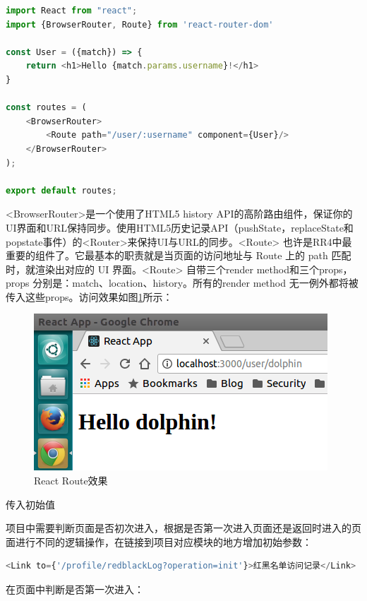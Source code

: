 \documentclass[12pt]{book}
\makeatletter
\numberwithin{dummy}{section}
\theoremstyle{ocrenumbox}
\theoremstyle{blacknumex}
\theoremstyle{blacknumbox}
\theoremstyle{ocrenum}
\renewcommand\paragraph{\@startsection{paragraph}{4}{\z@}
	{-2ex \@plus-.2ex \@minus .2ex}
	{.1ex}
	{\normalfont\small\sffamily\bfseries}}
\makeatother
\begin{document}
\begin{lstlisting}[language=Javascript]
import React from "react";
import {BrowserRouter, Route} from 'react-router-dom'

const User = ({match}) => {
	return <h1>Hello {match.params.username}!</h1>
}

const routes = (
	<BrowserRouter>
		<Route path="/user/:username" component={User}/>
	</BrowserRouter>
);

export default routes;
\end{lstlisting}

<BrowserRouter>是一个使用了HTML5 history API的高阶路由组件，保证你的UI界面和URL保持同步。使用HTML5历史记录API（pushState，replaceState和popstate事件）的<Router>来保持UI与URL的同步。<Route> 也许是RR4中最重要的组件了。它最基本的职责就是当页面的访问地址与 Route 上的 path 匹配时，就渲染出对应的 UI 界面。<Route> 自带三个render method和三个props，props 分别是：match、location、history。所有的render method 无一例外都将被传入这些props。访问效果如图\ref{fig:firstroute}所示：

\begin{figure}[htbp]
	\centering
	\includegraphics[scale=0.6]{firstroute.png}
	\caption{React Route效果}
	\label{fig:firstroute}
\end{figure}

\paragraph{传入初始值}

项目中需要判断页面是否初次进入，根据是否第一次进入页面还是返回时进入的页面进行不同的逻辑操作，在链接到项目对应模块的地方增加初始参数：

\begin{lstlisting}[language=Javascript]
<Link to={'/profile/redblackLog?operation=init'}>红黑名单访问记录</Link>
\end{lstlisting}

在页面中判断是否第一次进入：
\end{document}
